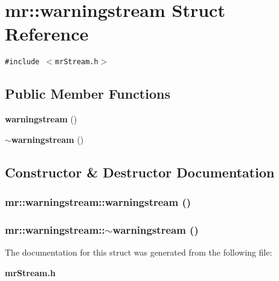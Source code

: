 \section{mr::warningstream Struct Reference}
\label{structmr_1_1warningstream}
{\tt \#include $<$mr\-Stream.h$>$}

\subsection*{Public Member Functions}
\begin{CompactItemize}
\item 
{\bf warningstream} ()
\item 
{\bf $\sim$warningstream} ()
\end{CompactItemize}


\subsection{Constructor \& Destructor Documentation}
\subsubsection{\setlength{\rightskip}{0pt plus 5cm}mr::warningstream::warningstream ()\hspace{0.3cm}{\tt  [inline]}}\label{structmr_1_1warningstream_a0}


\subsubsection{\setlength{\rightskip}{0pt plus 5cm}mr::warningstream::$\sim${\bf warningstream} ()\hspace{0.3cm}{\tt  [inline]}}\label{structmr_1_1warningstream_a1}




The documentation for this struct was generated from the following file:\begin{CompactItemize}
\item 
{\bf mr\-Stream.h}\end{CompactItemize}
